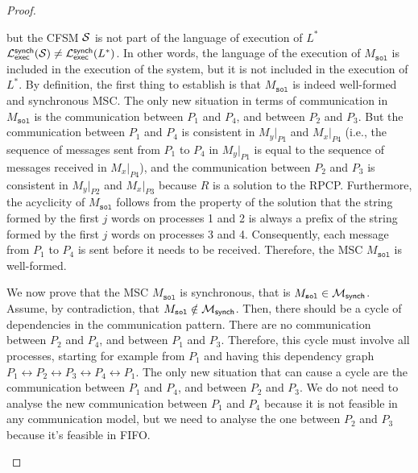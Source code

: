 \begin{proof}
\begin{itemize}
			but the CFSM $\mathcal{S}$ is not part of the language of execution of $L^*$ 
			$\mathcal{L}_{\mathsf{exec}}^{\mathsf{synch}}(\mathcal{S}) \neq \mathcal{L}_{\mathsf{exec}}^{\mathsf{synch}}(L^*)$. 
			In other words, the language of the execution of $M_{\texttt{sol}}$ is included
			in the execution of the system, but it is not included in the execution of $L^*$. 
			By definition, the first thing to establish is that $M_{\texttt{sol}}$
			is indeed well-formed and synchronous MSC.
			The only new situation in terms of communication in $M_{\texttt{sol}}$ is the
			communication between $P_1$ and $P_4$, and between $P_2$ and $P_3$.
			But the communication between $P_1$ and $P_4$ is consistent in
			$M_y|_{P1}$ and $M_x|_{P4}$ (i.e., the sequence of messages sent from $P_1$ to
			$P_4$ in $M_y|_{P1}$ is equal to the sequence of messages received in $M_x|_{P4}$),
			and the communication between $P_2$ and $P_3$ is consistent in
			$M_y|_{P2}$ and $M_x|_{P3}$ because $R$ is a solution to the RPCP.
			Furthermore, the acyclicity of $M_{\texttt{sol}}$ follows from the property of the
			solution that the string formed by the first $j$ words on processes 1
			and 2 is always a prefix of the string formed by the first $j$ words
			on processes 3 and 4. Consequently, each message from $P_1$ to $P_4$
			is sent before it needs to be received. 
			Therefore, the MSC $M_{\texttt{sol}}$ is well-formed.

			We now prove that the MSC $M_{\texttt{sol}}$ is synchronous, that is
			$M_{\texttt{sol}} \in \mathcal{M}_{\mathsf{synch}}$.
			Assume, by contradiction, that 
			$M_{\texttt{sol}} \notin \mathcal{M}_{\mathsf{synch}}$.
			Then, there should be a cycle of dependencies in the communication pattern.
			There are no communication between $P_2$ and $P_4$, and between $P_1$
			and $P_3$. Therefore, this cycle must involve all processes, starting
			for example from $P_1$ and having this dependency graph
			$P_1\leftrightarrow P_2\leftrightarrow P_3\leftrightarrow P_4\leftrightarrow P_1$.
			The only new situation that can cause a cycle are the communication
			between $P_1$ and $P_4$, and between $P_2$ and $P_3$.
			We do not need to analyse the new communication between $P_1$ and $P_4$ because
			it is not feasible in any communication model, but we need to analyse the one
			between $P_2$ and $P_3$ because it's feasible in FIFO.




\end{itemize}
\end{proof}
